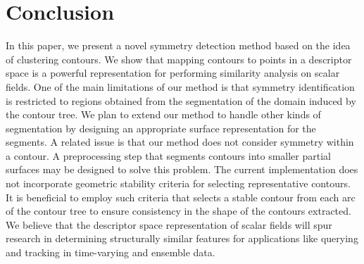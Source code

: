 \documentclass[review,journal]{vgtc}         %
\begin{document}
\section{Conclusion}
In this paper, we present a novel symmetry detection method based on the idea of clustering contours.
We show that mapping contours to points in a descriptor space is a powerful representation for
performing similarity analysis on scalar fields. One of the main limitations of our method is that
symmetry identification is restricted to regions obtained from the segmentation of the domain induced
by the contour tree. We plan to extend our method to handle other kinds of segmentation by designing
an appropriate surface representation for the segments. A related issue is that our method does not 
consider symmetry within a contour. A preprocessing step that segments contours into smaller partial
surfaces may be designed to solve this problem. The current implementation
does not incorporate geometric stability criteria for selecting representative contours. 
It is beneficial to employ such criteria that selects a stable contour 
from each arc of the contour tree to ensure consistency
in the shape of the contours extracted.
{\color{blue}We believe
that the descriptor space representation of scalar fields will spur research in determining structurally
similar features for applications like querying  and tracking in 
time-varying and ensemble data.}
%
%
%
%
%
\end{document}
